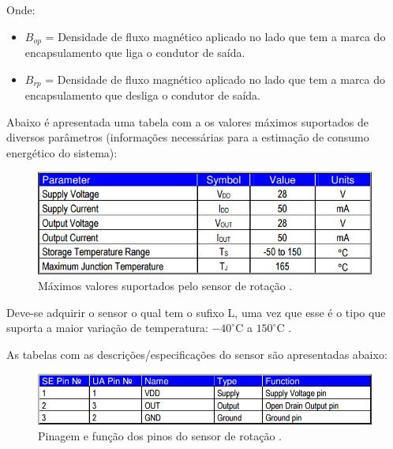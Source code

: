 	Onde:
	
	\begin{itemize}
	 \item $B_{op}$ = Densidade de fluxo magnético aplicado no lado que tem a marca do encapsulamento que liga o condutor de saída.
	 \item $B_{rp}$ = Densidade de fluxo magnético aplicado no lado que tem a marca do encapsulamento que desliga o condutor de saída.
	\end{itemize}
	
	Abaixo é apresentada uma tabela com a os valores máximos suportados de diversos parâmetros 
	(informações necessárias para a estimação de consumo energético do sistema):
	
	\begin{figure}[!htbp]
	  \centering
	  \includegraphics[scale=0.5]{editaveis/figuras/sensor_rotacao_max_valores}
	  \caption[Máximos valores suportados pelo sensor de rotação.]
	  {Máximos valores suportados pelo sensor de rotação \cite{melexis}.}
	  \label{sensor_rotacao_max_valores}
	\end{figure}
	
	Deve-se adquirir o sensor o qual tem o sufixo $\mathrm{L}$, uma vez que esse é o tipo que suporta a maior variação de
	temperatura: $-40^\circ\mathrm{C}$ a $150^\circ\mathrm{C}$ \cite{melexis}.
	
	As tabelas com as descrições/especificações do sensor são apresentadas abaixo:
	
	\begin{figure}[!htbp]
	  \centering
	  \includegraphics[scale=0.5]{editaveis/figuras/sensor_rotacao_pinagem}
	  \caption[Pinagem e função dos pinos do sensor de rotação]
	  {Pinagem e função dos pinos do sensor de rotação \cite{melexis}.}
	  \label{sensor_rotacao_pinagem}
	\end{figure}
	
